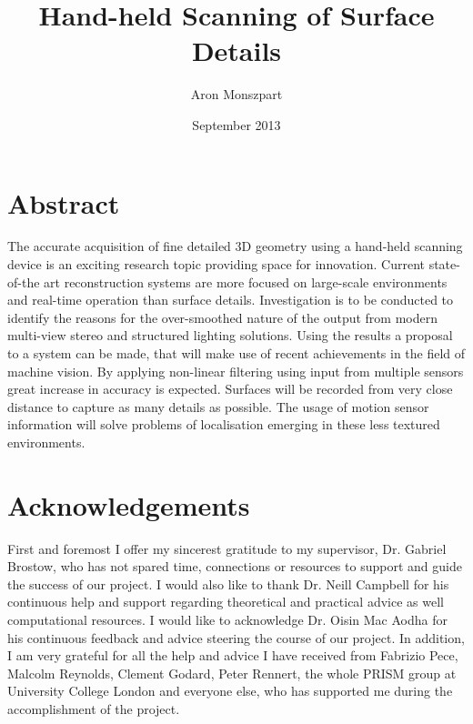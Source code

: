 \documentclass{ucl_thesis}
\author{Aron Monszpart}
\title{Hand-held Scanning of Surface Details}
\date{September 2013}
\begin{document}

\maketitle
{}
\setcounter{page}{1}
\pagestyle{plain}



\newpage
\section*{Abstract}

The accurate acquisition of fine detailed 3D geometry using a hand-held scanning device is an exciting research topic providing space for innovation. Current state-of-the art reconstruction systems are more focused on large-scale environments and real-time operation than surface details. Investigation is to be conducted to identify the reasons for the over-smoothed nature of the output from modern multi-view stereo and structured lighting solutions. Using the results a proposal to a system can be made, that will make use of recent achievements in the field of machine vision. By applying non-linear filtering using input from multiple sensors great increase in accuracy is expected. Surfaces will be recorded from very close distance to capture as many details as possible. The usage of motion sensor information will solve problems of localisation emerging in these less textured environments.


\newpage
\section*{Acknowledgements}
First and foremost I offer my sincerest gratitude to my supervisor, Dr. Gabriel Brostow, who has not spared time, connections or resources to support and guide the success of our project. I would also like to thank Dr. Neill Campbell for his continuous help and support regarding theoretical and practical advice as well computational resources. I would like to acknowledge Dr. Oisin Mac Aodha for his continuous feedback and advice steering the course of our project. In addition, I am very grateful for all the help and advice I have received from Fabrizio Pece, Malcolm Reynolds, Clement Godard, Peter Rennert, the whole PRISM group at University College London and everyone else, who has supported me during the accomplishment of the project.
\end{document}
